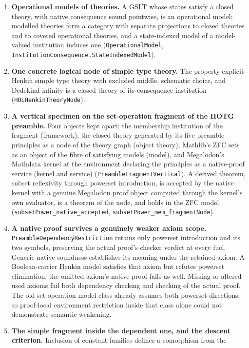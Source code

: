 \documentclass[11pt]{article}
\theoremstyle{definition}
\theoremstyle{remark}
\begin{document}
\begin{enumerate}
\item \textbf{Operational models of theories.}  A GSLT whose states satisfy
  a closed theory, with native consequence sound pointwise, is an operational
  model; modelled theories form a category with separate projections to
  closed theories and to covered operational theories, and a state-indexed
  model of a model-valued institution induces one
  (\texttt{OperationalModel}, \nolinkurl{InstitutionConsequence.StateIndexedModel}).
\item \textbf{One concrete logical node of simple type theory.}  The
  property-explicit Henkin simple type theory with excluded middle, schematic
  choice, and Dedekind infinity is a closed theory of its consequence
  institution (\texttt{HOLHenkinTheoryNode}).
\item \textbf{A vertical specimen on the set-operation fragment of the HOTG
  preamble.}  Four objects kept apart: the membership institution of the
  fragment (framework), the closed theory generated by its five preamble
  principles as a node of the theory graph (object theory), Mathlib's ZFC
  sets as an object of the fibre of satisfying models (model), and
  Megalodon's Mathdata kernel at the environment declaring the principles as
  a native-proof service (kernel and service)
  (\nolinkurl{PreambleFragmentVertical}).  A derived theorem, subset reflexivity
  through powerset introduction, is accepted by the native kernel with a
  genuine Megalodon proof object computed through the kernel's own
  evaluator, is a theorem of the node, and holds in the ZFC model
  (\nolinkurl{subsetPower_native_accepted}, \nolinkurl{subsetPower_mem_fragmentNode}).
\item \textbf{A native proof survives a genuinely weaker axiom scope.}
  \nolinkurl{PreambleDependencyRestriction} retains only powerset
  introduction and its two symbols, preserving the actual proof's checker
  verdict at every fuel. Generic native soundness establishes its meaning
  under the retained axiom. A Boolean-carrier Henkin model satisfies that
  axiom but refutes powerset elimination; the omitted axiom's native proof
  fails as well. Missing or altered used axioms fail both dependency checking
  and checking of the actual proof. The old set-operation model class already
  assumes both powerset directions, so proof-local environment restriction
  inside that class alone could not demonstrate semantic weakening.
\item \textbf{The simple fragment inside the dependent one, and the descent
  criterion.}  Inclusion of constant families defines a comorphism from the

\end{enumerate}
\end{document}
